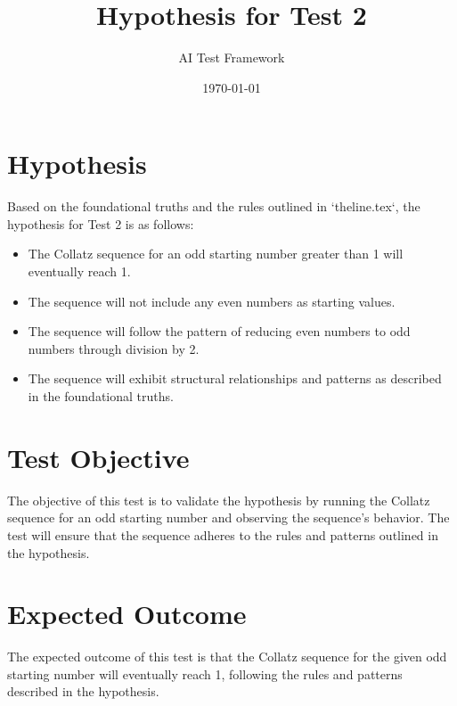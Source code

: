 \documentclass[11pt]{article}
\title{\textbf{Hypothesis for Test 2}}
\author{AI Test Framework}
\date{\today}
\begin{document}
\maketitle

\section*{\textbf{Hypothesis}}

Based on the foundational truths and the rules outlined in `theline.tex`, the hypothesis for Test 2 is as follows:

\begin{itemize}
    \item The Collatz sequence for an odd starting number greater than 1 will eventually reach 1.
    \item The sequence will not include any even numbers as starting values.
    \item The sequence will follow the pattern of reducing even numbers to odd numbers through division by 2.
    \item The sequence will exhibit structural relationships and patterns as described in the foundational truths.
\end{itemize}

\section*{\textbf{Test Objective}}

The objective of this test is to validate the hypothesis by running the Collatz sequence for an odd starting number and observing the sequence's behavior. The test will ensure that the sequence adheres to the rules and patterns outlined in the hypothesis.

\section*{\textbf{Expected Outcome}}

The expected outcome of this test is that the Collatz sequence for the given odd starting number will eventually reach 1, following the rules and patterns described in the hypothesis.
\end{document}
